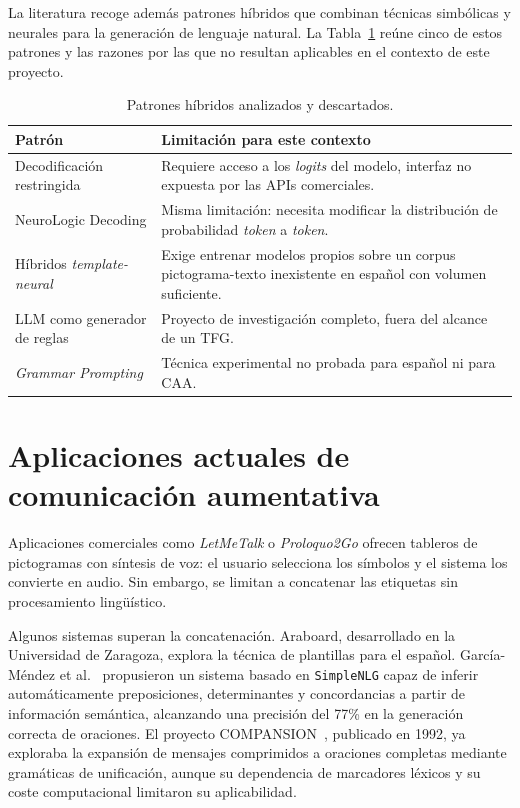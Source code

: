 La literatura recoge además patrones híbridos que combinan técnicas simbólicas y neurales para la generación de lenguaje natural. La Tabla~\ref{tab:h-patrones-descartados} reúne cinco de estos patrones y las razones por las que no resultan aplicables en el contexto de este proyecto.

\begin{table}[H]
\centering
\small
\begin{tabular}{p{4.5cm} p{7.5cm}}
\hline
Patrón & Limitación para este contexto \\
\hline
Decodificación restringida & Requiere acceso a los \textit{logits} del modelo, interfaz no expuesta por las APIs comerciales. \\
NeuroLogic Decoding & Misma limitación: necesita modificar la distribución de probabilidad \textit{token} a \textit{token}. \\
Híbridos \textit{template-neural} & Exige entrenar modelos propios sobre un corpus pictograma-texto inexistente en español con volumen suficiente. \\
LLM como generador de reglas & Proyecto de investigación completo, fuera del alcance de un TFG. \\
\textit{Grammar Prompting} & Técnica experimental no probada para español ni para CAA. \\
\hline
\end{tabular}
\caption{Patrones híbridos analizados y descartados.}
\label{tab:h-patrones-descartados}
\end{table}

\section{Aplicaciones actuales de comunicación aumentativa}

Aplicaciones comerciales como \textit{LetMeTalk} o \textit{Proloquo2Go} ofrecen tableros de pictogramas con síntesis de voz: el usuario selecciona los símbolos y el sistema los convierte en audio. Sin embargo, se limitan a concatenar las etiquetas sin procesamiento lingüístico.

Algunos sistemas superan la concatenación. Araboard, desarrollado en la Universidad de Zaragoza, explora la técnica de plantillas para el español. García-Méndez et al.~\cite{garciamendez2018aac} propusieron un sistema basado en \texttt{SimpleNLG} capaz de inferir automáticamente preposiciones, determinantes y concordancias a partir de información semántica, alcanzando una precisión del 77\% en la generación correcta de oraciones. El proyecto COMPANSION~\cite{demasco1992compansion}, publicado en 1992, ya exploraba la expansión de mensajes comprimidos a oraciones completas mediante gramáticas de unificación, aunque su dependencia de marcadores léxicos y su coste computacional limitaron su aplicabilidad.


